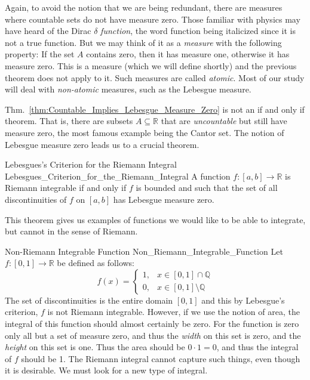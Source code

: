 \documentclass[crop=false,class=article]{standalone}                           %
\begin{document}
        Again, to avoid the notion that we are being redundant, there are
        measures where countable sets do not have measure zero. Those
        familiar with physics may have heard of the Dirac
        $\delta$ \textit{function}, the word function being italicized since it
        is not a true function. But we may think of it as a \textit{measure}
        with the following property: If the set $A$ contains zero, then it has
        measure one, otherwise it has measure zero. This is a measure (which we
        will define shortly) and the previous theorem does not apply to it. Such
        measures are called \textit{atomic}. Most of our study will deal with
        \textit{non-atomic} measures, such as the Lebesgue measure.
        \par\hfill\par
        Thm.~\ref{thm:Countable_Implies_Lebesgue_Measure_Zero} is not an if and
        only if theorem. That is, there are subsets $A\subseteq\mathbb{R}$ that
        are \textit{uncountable} but still have measure zero, the most famous
        example being the Cantor set. The notion of Lebesgue measure zero leads
        us to a crucial theorem.
        \begin{ltheorem}{Lebesgues's Criterion for the Riemann Integral}
                        {Lebesgues_Criterion_for_the_Riemann_Integral}
            A function $f:[a,b]\rightarrow\mathbb{R}$ is Riemann integrable
            if and only if $f$ is bounded and such that the set of all
            discontinuities of $f$ on $[a,b]$ has Lebesgue measure zero.
        \end{ltheorem}
        This theorem gives us examples of functions we would like to be
        able to integrate, but cannot in the sense of Riemann.
        \begin{lexample}{Non-Riemann Integrable Function}
                        {Non_Riemann_Integrable_Function}
            Let $f:[0,1]\rightarrow\mathbb{R}$ be defined as follows:
            \begin{equation}
                f(x)=
                \begin{cases}
                    1,&x\in[0,1]\cap\mathbb{Q}\\
                    0,&x\in[0,1]\setminus\mathbb{Q}
                \end{cases}
            \end{equation}
            The set of discontinuities is the entire domain $[0,1]$ and
            this by Lebesgue's criterion, $f$ is not Riemann integrable.
            However, if we use the notion of area, the integral of this
            function should almost certainly be zero. For the function is
            zero only all but a set of measure zero, and thus the
            \textit{width} on this set is zero, and the \textit{height} on
            this set is one. Thus the area should be $0\cdot{1}=0$, and thus
            the integral of $f$ should be 1. The Riemann integral cannot
            capture such things, even though it is desirable. We must look
            for a new type of integral.
        \end{lexample}
\end{document}

